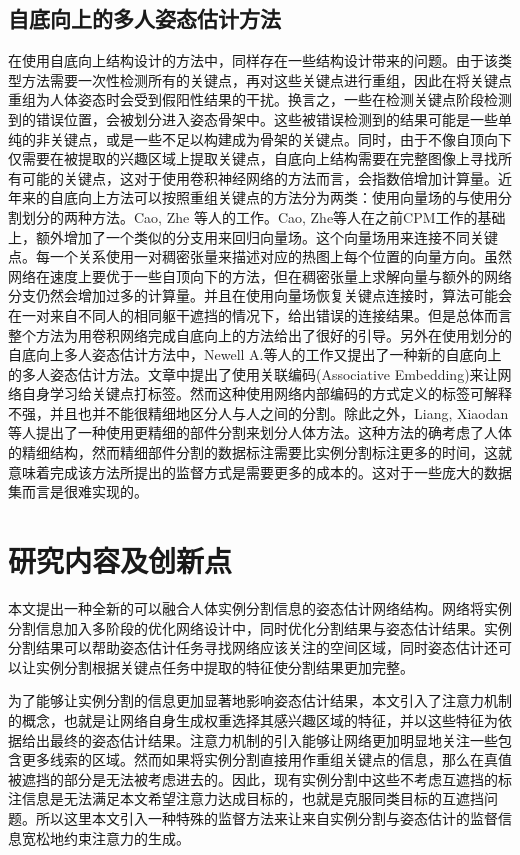 \subsection{自底向上的多人姿态估计方法}
\label{subsec:bottomup}
在使用自底向上结构设计的方法中，同样存在一些结构设计带来的问题。由于该类型方法需要一次性检测所有的关键点，再对这些关键点进行重组，因此在将关键点重组为人体姿态时会受到假阳性结果的干扰。换言之，一些在检测关键点阶段检测到的错误位置，会被划分进入姿态骨架中。这些被错误检测到的结果可能是一些单纯的非关键点，或是一些不足以构建成为骨架的关键点。同时，由于不像自顶向下仅需要在被提取的兴趣区域上提取关键点，自底向上结构需要在完整图像上寻找所有可能的关键点，这对于使用卷积神经网络的方法而言，会指数倍增加计算量。近年来的自底向上方法可以按照重组关键点的方法分为两类：使用向量场的与使用分割划分的两种方法。Cao, Zhe 等人的工作\cite{Cao2016Realtime}。Cao, Zhe等人在之前CPM工作的基础上，额外增加了一个类似的分支用来回归向量场。这个向量场用来连接不同关键点。每一个关系使用一对稠密张量来描述对应的热图上每个位置的向量方向。虽然网络在速度上要优于一些自顶向下的方法，但在稠密张量上求解向量与额外的网络分支仍然会增加过多的计算量。并且在使用向量场恢复关键点连接时，算法可能会在一对来自不同人的相同躯干遮挡的情况下，给出错误的连接结果。但是总体而言整个方法为用卷积网络完成自底向上的方法给出了很好的引导。另外在使用划分的自底向上多人姿态估计方法中，Newell A.等人的工作\cite{Newell2017Associative}又提出了一种新的自底向上的多人姿态估计方法。文章中提出了使用关联编码(Associative Embedding)来让网络自身学习给关键点打标签。然而这种使用网络内部编码的方式定义的标签可解释不强，并且也并不能很精细地区分人与人之间的分割。除此之外，Liang, Xiaodan等人提出了一种使用更精细的部件分割来划分人体方法\cite{liang2019look}。这种方法的确考虑了人体的精细结构，然而精细部件分割的数据标注需要比实例分割标注更多的时间，这就意味着完成该方法所提出的监督方式是需要更多的成本的。这对于一些庞大的数据集而言是很难实现的。

\section{研究内容及创新点}
\label{sec:contribution}
本文提出一种全新的可以融合人体实例分割信息的姿态估计网络结构。网络将实例分割信息加入多阶段的优化网络设计中，同时优化分割结果与姿态估计结果。实例分割结果可以帮助姿态估计任务寻找网络应该关注的空间区域，同时姿态估计还可以让实例分割根据关键点任务中提取的特征使分割结果更加完整。

为了能够让实例分割的信息更加显著地影响姿态估计结果，本文引入了注意力机制的概念，也就是让网络自身生成权重选择其感兴趣区域的特征，并以这些特征为依据给出最终的姿态估计结果。注意力机制的引入能够让网络更加明显地关注一些包含更多线索的区域。然而如果将实例分割直接用作重组关键点的信息，那么在真值被遮挡的部分是无法被考虑进去的。因此，现有实例分割中这些不考虑互遮挡的标注信息是无法满足本文希望注意力达成目标的，也就是克服同类目标的互遮挡问题。所以这里本文引入一种特殊的监督方法来让来自实例分割与姿态估计的监督信息宽松地约束注意力的生成。

